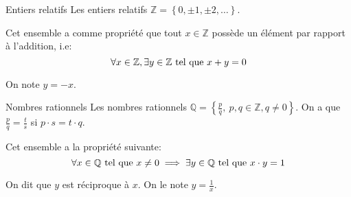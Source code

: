 \documentclass{article}
\begin{document}
\begin{parag}{Entiers relatifs}
    Les entiers relatifs $\mathbb{Z} = \left\{0, \pm 1, \pm 2, \ldots \right\}$.

    Cet ensemble a comme propriété que tout $x \in \mathbb{Z}$ possède un élément  par rapport à l'addition, i.e:
    \[\forall x \in \mathbb{Z}, \exists y \in \mathbb{Z} \text{ tel que } x + y = 0\]

    On note $y = -x$.
\end{parag}

\begin{parag}{Nombres rationnels}
    Les nombres rationnels $\mathbb{Q} = \left\{\frac{p}{q},\ p, q \in \mathbb{Z}, q \neq 0\right\}$. On a que $\frac{p}{q} = \frac{t}{s}$ si $p\cdot s = t\cdot q$.

    Cet ensemble a la propriété suivante:
    \[\forall x \in \mathbb{Q} \text{ tel que } x \neq 0 \implies \exists y \in \mathbb{Q} \text{ tel que } x\cdot y = 1\]

    On dit que $y$ est réciproque à $x$. On le note $y = \frac{1}{x}$.
\end{parag}
\end{document}

